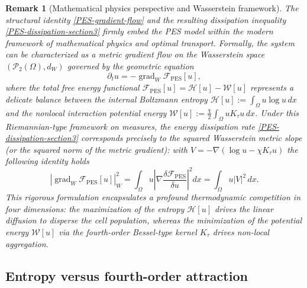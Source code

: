 \documentclass[pdflatex,sn-mathphys-num]{sn-jnl}%
\theoremstyle{thmstyleone}
\theoremstyle{thmstyletwo}
\newtheorem{remark}{Remark}
\theoremstyle{thmstylethree}
\begin{document}
\begin{remark}[Mathematical physics perspective and Wasserstein framework]
\label{rem:gradient-flow-physics}
The structural identity \eqref{PES-gradient-flow} and the resulting dissipation inequality \eqref{PES-dissipation-section3} firmly embed the PES model within the modern framework of mathematical physics and optimal transport. Formally, the system can be characterized as a metric gradient flow on the Wasserstein space $(\mathcal{P}_2(\Omega), d_W)$ governed by the geometric equation
\[
        \partial_t u = -\operatorname{grad}_{W} \mathcal F_{\mathrm{PES}}[u],
\]
where the total free energy functional $\mathcal F_{\mathrm{PES}}[u] = \mathcal{H}[u] - \mathcal{W}[u]$ represents a delicate balance between the internal Boltzmann entropy $\mathcal{H}[u] := \int_\Omega u \log u \,dx$ and the nonlocal interaction potential energy $\mathcal{W}[u] := \frac{\chi}{2}\int_\Omega u K_\tau u \,dx$. Under this Riemannian-type framework on measures, the energy dissipation rate \eqref{PES-dissipation-section3} corresponds precisely to the squared Wasserstein metric slope (or the squared norm of the metric gradient): with $ V=-\nabla(\log u-\chi K_\tau u)$ the following identity holds
\[
        \left| \operatorname{grad}_{W} \mathcal F_{\mathrm{PES}}[u] \right|^2_{W} 
        = \int_\Omega u \left|\nabla \frac{\delta \mathcal F_{\mathrm{PES}}}{\delta u}\right|^2 dx 
        = \int_\Omega u |V|^2 \,dx.
\]
This rigorous formulation encapsulates a profound thermodynamic competition in four dimensions: the maximization of the entropy $\mathcal{H}[u]$ drives the linear diffusion to disperse the cell population, whereas the minimization of the potential energy $\mathcal{W}[u]$ via the fourth-order Bessel-type kernel $K_\tau$ drives non-local aggregation. 
\end{remark}

\subsection{Entropy versus fourth-order attraction}
\end{document}
